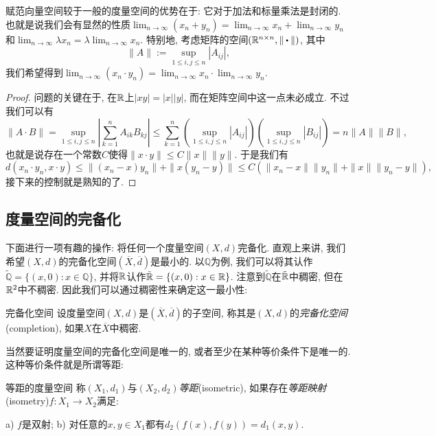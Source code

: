 赋范向量空间较于一般的度量空间的优势在于: 它对于加法和标量乘法是封闭的. 也就是说我们会有显然的性质$\lim_{n\to \infty} (x_n+y_n) = \lim_{n\to \infty} x_n + \lim_{n\to \infty} y_n$和$\lim_{n\to \infty} \lambda x_n = \lambda \lim_{n\to \infty} x_n$. 特别地, 考虑矩阵的空间$(\R ^{n\times n},\| \bigcdot \|)$, 其中$$\| A \| := \sup_{1 \leq i,j \leq n} |A_{ij}|,$$
我们希望得到$\lim_{n\to \infty} (x_n \cdot y_n) = \lim_{n\to \infty} x_n \cdot \lim_{n\to \infty} y_n$. 
\begin{proof}
	问题的关键在于, 在$\mathbb{R}$上$|xy|=|x||y|$, 而在矩阵空间中这一点未必成立. 不过我们可以有$$\| A \cdot B \| = \sup_{1 \leq i,j \leq n} |\sum_{k=1}^{n}A_{ik}B_{kj}| \leq \sum_{k=1}^n (\sup_{1 \leq i,j \leq n} |A_{ij}|)(\sup_{1 \leq i,j \leq n} |B_{ij}|) = n\| A \| \| B \|,$$
	也就是说存在一个常数$C$使得$\| x\cdot y \| \leq C\| x \| \| y \|$. 于是我们有$$d(x_n \cdot y_n,x \cdot y) \leq \| (x_n-x)y_n \| 
		+ \| x(y_n-y) \| \leq C(\| x_n-x \| \| y_n \| 
		+ \| x \| \| y_n-y \|),$$
	接下来的控制就是熟知的了. 
\end{proof}

\subsection{度量空间的完备化}

下面进行一项有趣的操作: 将任何一个度量空间$(X,d)$完备化. 直观上来讲, 我们希望$(X,d)$的完备化空间$(\overline{X},\overline{d})$是最小的. 以$\mathbb{Q}$为例, 我们可以将其认作$\tilde{\mathbb{Q}}=\{ (x,0):x \in \mathbb{Q} \}$, 并将$\mathbb{R}$认作$\tilde{\mathbb{R}}=\{ (x,0):x \in \mathbb{R} \}$. 注意到$\tilde{\mathbb{Q}}$在$\tilde{\mathbb{R}}$中稠密, 但在$\mathbb{R} ^2$中不稠密. 因此我们可以通过稠密性来确定这一最小性:

\begin{definition}{完备化空间}
	设度量空间$(X,d)$是$(\overline{X},\overline{d})$的子空间, 称其是$(X,d)$的\textit{完备化空间}(completion), 如果$X$在$\overline{X}$中稠密. 
\end{definition}

当然要证明度量空间的完备化空间是唯一的, 或者至少在某种等价条件下是唯一的. 这种等价条件就是所谓等距: 

\begin{definition}{等距的度量空间}
	称$(X_1,d_1)$与$(X_2,d_2)$\textit{等距}(isometric), 如果存在\textit{等距映射}(isometry)$f:X_1 \to X_2$满足: 
	
	a) $f$是双射; \qquad b) 对任意的$x,y \in X_1$都有$d_2(f(x),f(y))=d_1(x,y)$. 
\end{definition}

